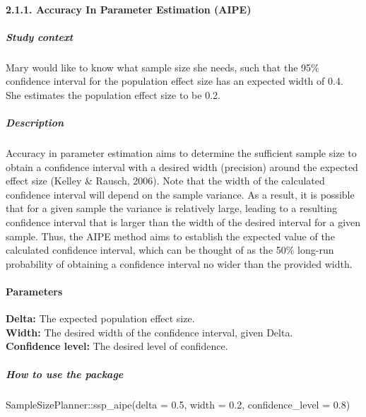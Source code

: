 \documentclass[
  english,
  man,floatsintext]{apa6}
\newenvironment{Shaded}{\begin{snugshade}}{\end{snugshade}}
\newcommand{\AttributeTok}[1]{\textcolor[rgb]{0.77,0.63,0.00}{#1}}
\newcommand{\FloatTok}[1]{\textcolor[rgb]{0.00,0.00,0.81}{#1}}
\newcommand{\FunctionTok}[1]{\textcolor[rgb]{0.00,0.00,0.00}{#1}}
\newcommand{\NormalTok}[1]{#1}
\newcommand{\SpecialCharTok}[1]{\textcolor[rgb]{0.00,0.00,0.00}{#1}}
\let\oldparagraph\paragraph
\renewcommand{\paragraph}[1]{\oldparagraph{#1}\mbox{}}
\let\oldsubparagraph\subparagraph
\renewcommand{\subparagraph}[1]{\oldsubparagraph{#1}\mbox{}}
\begin{document}
\hypertarget{accuracy-in-parameter-estimation-aipe}{%
\paragraph{2.1.1. Accuracy In Parameter Estimation (AIPE)}\label{accuracy-in-parameter-estimation-aipe}}

\hypertarget{study-context-6}{%
\subparagraph{Study context}\label{study-context-6}}

Mary would like to know what sample size she needs, such that the 95\% confidence interval for the population effect size has an expected width of 0.4. She estimates the population effect size to be 0.2.

\hypertarget{description-6}{%
\subparagraph{Description}\label{description-6}}

Accuracy in parameter estimation aims to determine the sufficient sample size to obtain a confidence interval with a desired width (precision) around the expected effect size (Kelley \& Rausch, 2006). Note that the width of the calculated confidence interval will depend on the sample variance. As a result, it is possible that for a given sample the variance is relatively large, leading to a resulting confidence interval that is larger than the width of the desired interval for a given sample. Thus, the AIPE method aims to establish the expected value of the calculated confidence interval, which can be thought of as the 50\% long-run probability of obtaining a confidence interval no wider than the provided width.

\hypertarget{parameters-6}{%
\paragraph{Parameters}\label{parameters-6}}

\textbf{Delta:} The expected population effect size.\\
\textbf{Width:} The desired width of the confidence interval, given Delta.\\
\textbf{Confidence level:} The desired level of confidence.\\

\hypertarget{how-to-use-the-package-6}{%
\subparagraph{How to use the package}\label{how-to-use-the-package-6}}

\begin{Shaded}
\begin{Highlighting}[]
\NormalTok{SampleSizePlanner}\SpecialCharTok{::}\FunctionTok{ssp\_aipe}\NormalTok{(}\AttributeTok{delta =} \FloatTok{0.5}\NormalTok{, }\AttributeTok{width =} \FloatTok{0.2}\NormalTok{, }\AttributeTok{confidence\_level =} \FloatTok{0.8}\NormalTok{)}
\end{Highlighting}
\end{Shaded}
\end{document}
